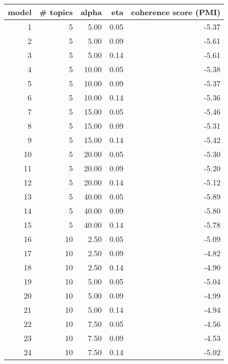 \begin{tabular}{rrrrr}
\toprule
 model &  \# topics &  alpha &  eta &  coherence score (PMI) \\
\midrule
     1 &         5 &   5.00 & 0.05 &                  -5.37 \\
     2 &         5 &   5.00 & 0.09 &                  -5.61 \\
     3 &         5 &   5.00 & 0.14 &                  -5.61 \\
     4 &         5 &  10.00 & 0.05 &                  -5.38 \\
     5 &         5 &  10.00 & 0.09 &                  -5.37 \\
     6 &         5 &  10.00 & 0.14 &                  -5.36 \\
     7 &         5 &  15.00 & 0.05 &                  -5.46 \\
     8 &         5 &  15.00 & 0.09 &                  -5.31 \\
     9 &         5 &  15.00 & 0.14 &                  -5.42 \\
    10 &         5 &  20.00 & 0.05 &                  -5.30 \\
    11 &         5 &  20.00 & 0.09 &                  -5.20 \\
    12 &         5 &  20.00 & 0.14 &                  -5.12 \\
    13 &         5 &  40.00 & 0.05 &                  -5.89 \\
    14 &         5 &  40.00 & 0.09 &                  -5.80 \\
    15 &         5 &  40.00 & 0.14 &                  -5.78 \\
    16 &        10 &   2.50 & 0.05 &                  -5.09 \\
    17 &        10 &   2.50 & 0.09 &                  -4.82 \\
    18 &        10 &   2.50 & 0.14 &                  -4.90 \\
    19 &        10 &   5.00 & 0.05 &                  -5.04 \\
    20 &        10 &   5.00 & 0.09 &                  -4.99 \\
    21 &        10 &   5.00 & 0.14 &                  -4.94 \\
    22 &        10 &   7.50 & 0.05 &                  -4.56 \\
    23 &        10 &   7.50 & 0.09 &                  -4.53 \\
    24 &        10 &   7.50 & 0.14 &                  -5.02 \\

\end{tabular}
